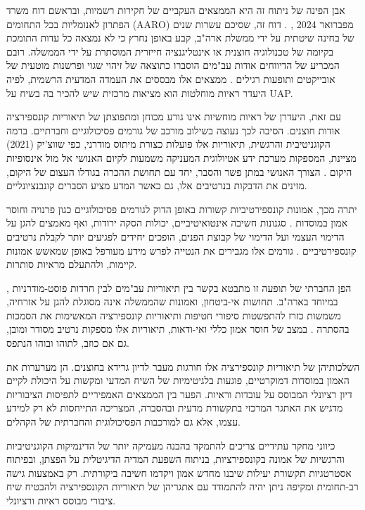 \documentclass[12pt,a4paper]{article}
\begin{document}
אבן הפינה של ניתוח זה היא הממצאים העקביים של חקירות רשמיות, ובראשם דוח משרד הפתרון לאנומליות בכל התחומים (AARO) מפברואר 2024 \cite{aaro2024misidentification}, \cite{aaro2024noevidence}. דוח זה, שסיכם עשרות שנים של בחינה שיטתית על ידי ממשלת ארה"ב, קבע באופן נחרץ כי לא נמצאה כל עדות התומכת בקיומה של טכנולוגיה חוצנית או אינטליגנציה חייזרית המוסתרת על ידי הממשלה. רובם המכריע של הדיווחים אודות עב"מים הוסברו כתוצאה של זיהוי שגוי ופרשנות מוטעית של אובייקטים ותופעות רגילים \cite{aaro2024misidentification}. ממצאים אלו מבססים את העמדה המדעית הרשמית, לפיה היעדר ראיות מוחלטות הוא מציאות מרכזית שיש להכיר בה בשיח על UAP.

עם זאת, היעדרן של ראיות מוחשיות אינו גורע מכוחן ומתפוצתן של תיאוריות קונספירציה אודות חוצנים. הסיבה לכך נעוצה בשילוב מורכב של גורמים פסיכולוגיים וחברתיים. ברמה הקוגניטיבית והרגשית, תיאוריות אלו פועלות כצורת מיתוס מודרני, כפי שווצ'יק (2021) מציינת, המספקות מערכת ידע אטיולוגית המעניקה משמעות לקיום האנושי אל מול אינסופיות היקום \cite{wojcik2021cosmologies}. הצורך האנושי במתן פשר והסבר, יחד עם תחושת ההכרה בגודלו העצום של היקום, מזינים את הדבקות בנרטיבים אלו, גם כאשר המדע מציע הסברים קונבנציונליים.

יתרה מכך, אמונות קונספירטיביות קשורות באופן הדוק לגורמים פסיכולוגיים כגון פרנויה וחוסר אמון במוסדות \cite{bowes2023conspiracy}. סגנונות חשיבה אינטואיטיביים, יכולות הסקה ירודות, ואף מאמצים להגן על הדימוי העצמי ועל הדימוי של קבוצת הפנים, הופכים יחידים לפגיעים יותר לקבלת נרטיבים קונספירטיביים \cite{biddlestone2025conspiracy}. גורמים אלו מגבירים את הנטייה לפרש מידע מעורפל באופן שמאשש אמונות קיימות, ולהתעלם מראיות סותרות.

הפן החברתי של תופעה זו מתבטא בקשר בין תיאוריות עב"מים לבין חרדות פוסט-מודרניות \cite{ellwood1999ufo}, במיוחד בארה"ב. תחושות אי-ביטחון, ואמונות שהממשלה אינה מסוגלת להגן על אזרחיה, משמשות כזרז להתפשטות סיפורי חטיפות ותיאוריות קונספירציה המאשימות את הסמכות בהסתרה \cite{ellwood1999ufo}. במצב של חוסר אמון כללי ואי-ודאות, תיאוריות אלו מספקות נרטיב מסודר ומובן, גם אם כוזב, לתוהו ובוהו הנתפס.

השלכותיהן של תיאוריות קונספירציה אלו חורגות מעבר לדיון גרידא בחוצנים. הן מערערות את האמון במוסדות דמוקרטיים, פוגעות בלגיטימיות של השיח המדעי ומקשות על היכולת לקיים דיון רציונלי המבוסס על עובדות וראיות. הפער בין הממצאים האמפיריים לתפיסות הציבוריות מדגיש את האתגר המרכזי בתקשורת מדעית ובהסברה, המצריכה התייחסות לא רק למידע עצמו, אלא גם למורכבות הפסיכולוגית והחברתית של הקהלים.

כיווני מחקר עתידיים צריכים להתמקד בהבנה מעמיקה יותר של הדינמיקות הקוגניטיביות והרגשיות של אמונה בקונספירציות, בניתוח השפעת המדיה הדיגיטלית על הפצתן, ובפיתוח אסטרטגיות תקשורת יעילות שיבנו מחדש אמון ויקדמו חשיבה ביקורתית. רק באמצעות גישה רב-תחומית ומקיפה ניתן יהיה להתמודד עם אתגריהן של תיאוריות הקונספירציה ולהבטיח שיח ציבורי מבוסס ראיות ורציונלי.

\clearpage

\newpage
\printbibliography[title={רשימת מקורות}]
\end{document}

